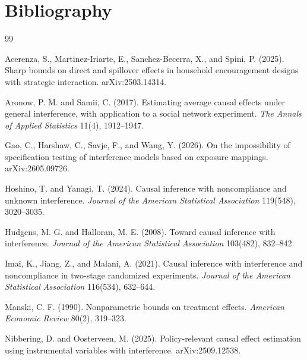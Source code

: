 \documentclass[11pt]{article}
\theoremstyle{definition}
\theoremstyle{plain}
\theoremstyle{remark}
\begin{document}
\section{Bibliography}
\begin{thebibliography}{99}

Acerenza, S., Martinez-Iriarte, E., Sanchez-Becerra, X., and Spini, P. (2025).
Sharp bounds on direct and spillover effects in household encouragement designs with strategic interaction.
arXiv:2503.14314.

Aronow, P. M. and Samii, C. (2017).
Estimating average causal effects under general interference, with application to a social network experiment.
\emph{The Annals of Applied Statistics} 11(4), 1912--1947.

Gao, C., Harshaw, C., Savje, F., and Wang, Y. (2026).
On the impossibility of specification testing of interference models based on exposure mappings.
arXiv:2605.09726.

Hoshino, T. and Yanagi, T. (2024).
Causal inference with noncompliance and unknown interference.
\emph{Journal of the American Statistical Association} 119(548), 3020--3035.

Hudgens, M. G. and Halloran, M. E. (2008).
Toward causal inference with interference.
\emph{Journal of the American Statistical Association} 103(482), 832--842.

Imai, K., Jiang, Z., and Malani, A. (2021).
Causal inference with interference and noncompliance in two-stage randomized experiments.
\emph{Journal of the American Statistical Association} 116(534), 632--644.

Manski, C. F. (1990).
Nonparametric bounds on treatment effects.
\emph{American Economic Review} 80(2), 319--323.

Nibbering, D. and Oosterveen, M. (2025).
Policy-relevant causal effect estimation using instrumental variables with interference.
arXiv:2509.12538.


\end{thebibliography}
\end{document}
